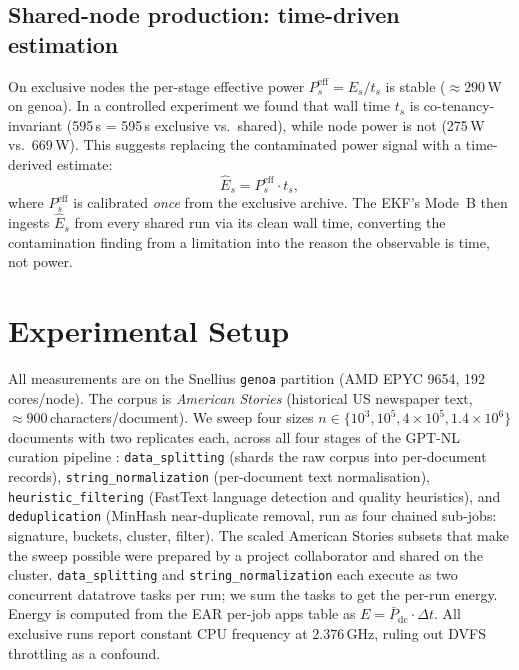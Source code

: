 \documentclass{article}
\begin{document}
\subsection{Shared-node production: time-driven estimation}

\label{sec:timedriven}

On exclusive nodes the per-stage effective power $P^{\mathrm{eff}}_s = E_s / t_s$ is stable ($\approx 290$\,W on genoa). In a controlled experiment we found that wall time $t_s$ is co-tenancy-invariant (595\,s = 595\,s exclusive vs.\ shared), while node power is not (275\,W vs.\ 669\,W). This suggests replacing the contaminated power signal with a time-derived estimate:
\begin{equation}
  \hat{E}_s = P^{\mathrm{eff}}_s \cdot t_s,
  \label{eq:timedriven}
\end{equation}
where $P^{\mathrm{eff}}_s$ is calibrated \emph{once} from the exclusive archive. The EKF's Mode~B then ingests $\hat{E}_s$ from every shared run via its clean wall time, converting the contamination finding from a limitation into the reason the observable is time, not power.

\section{Experimental Setup}

All measurements are on the Snellius \texttt{genoa} partition (AMD EPYC 9654, 192 cores/node). The corpus is \emph{American Stories} \cite{american_stories} (historical US newspaper text, ${\approx}900$\,characters/document). We sweep four sizes $n \in \{10^3, 10^5, 4{\times}10^5, 1.4{\times}10^6\}$ documents with two replicates each, across all four stages of the GPT-NL curation pipeline \cite{gptnl_architecture}: \texttt{data\_splitting} (shards the raw corpus into per-document records), \texttt{string\_normalization} (per-document text normalisation), \texttt{heuristic\_filtering} (FastText language detection and quality heuristics), and \texttt{deduplication} (MinHash near-duplicate removal, run as four chained sub-jobs: signature, buckets, cluster, filter). The scaled American Stories subsets that make the sweep possible were prepared by a project collaborator and shared on the cluster. \texttt{data\_splitting} and \texttt{string\_normalization} each execute as two concurrent datatrove tasks per run; we sum the tasks to get the per-run energy. Energy is computed from the EAR per-job apps table as $E = \bar{P}_{\mathrm{dc}} \cdot \Delta t$. All exclusive runs report constant CPU frequency at $2.376$\,GHz, ruling out DVFS throttling as a confound.
\end{document}
